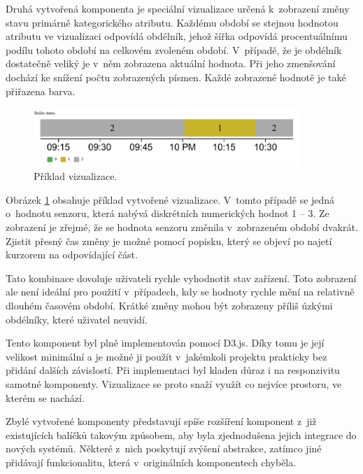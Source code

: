 Druhá vytvořená komponenta je speciální vizualizace určená k~zobrazení změny stavu primárně kategorického atributu. Každému období se stejnou hodnotou atributu ve vizualizaci odpovídá obdélník, jehož šířka odpovídá procentuálnímu podílu tohoto období na celkovém zvoleném období. V~případě, že je obdélník dostatečně veliký je v~něm zobrazena aktuální hodnota. Při jeho zmenšování dochází ke snížení počtu zobrazených písmen. Každé zobrazené hodnotě je také přiřazena barva.

\begin{figure}[H]
\label{switch-image}
\begin{center}
    \includegraphics[width=0.9\textwidth]{obrazky-figures/switch.pdf}
\end{center}
\caption{Příklad vizualizace.}
\end{figure}

Obrázek \ref{switch-image} obsahuje příklad vytvořené vizualizace. V~tomto případě se jedná o~hodnotu senzoru, která nabývá diskrétních numerických hodnot 1 -- 3. Ze zobrazení je zřejmé, že se hodnota senzoru změnila v~zobrazeném období dvakrát. Zjistit přesný čas změny je možné pomocí popisku, který se objeví po najetí kurzorem na odpovídající část.

Tato kombinace dovoluje uživateli rychle vyhodnotit stav zařízení. Toto zobrazení ale není ideální pro použití v~případech, kdy se hodnoty rychle mění na relativně dlouhém časovém období. Krátké změny mohou být zobrazeny příliš úzkými obdélníky, které uživatel neuvidí. 

Tento komponent byl plně implementován pomocí D3.js. Díky tomu je její velikost minimální a je možné ji použít v~jakémkoli projektu prakticky bez přidání dalších závislostí. Při implementaci byl kladen důraz i na responzivitu samotné komponenty. Vizualizace se proto snaží využít co nejvíce prostoru, ve kterém se nachází.

Zbylé vytvořené komponenty představují spíše rozšíření komponent z~již existujících balíčků takovým způsobem, aby byla zjednodušena jejich integrace do nových systémů. Některé z~nich poskytují zvýšení abstrakce, zatímco jiné přidávají funkcionalitu, která v~originálních komponentech chyběla.

